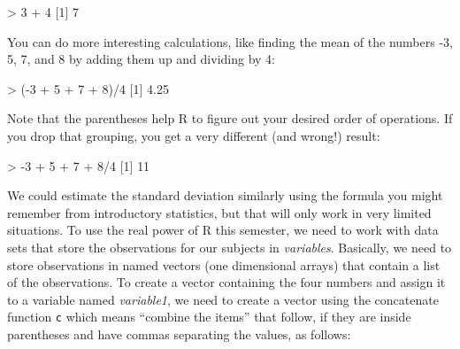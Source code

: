 \documentclass[
]{book}
\newenvironment{Shaded}{\begin{snugshade}}{\end{snugshade}}
\newcommand{\DecValTok}[1]{\textcolor[rgb]{0.00,0.00,0.81}{#1}}
\newcommand{\FloatTok}[1]{\textcolor[rgb]{0.00,0.00,0.81}{#1}}
\newcommand{\NormalTok}[1]{#1}
\newcommand{\SpecialCharTok}[1]{\textcolor[rgb]{0.00,0.00,0.00}{#1}}
\begin{document}
\begin{Shaded}
\begin{Highlighting}[]
\SpecialCharTok{\textgreater{}} \DecValTok{3} \SpecialCharTok{+} \DecValTok{4}
\NormalTok{[}\DecValTok{1}\NormalTok{] }\DecValTok{7}
\end{Highlighting}
\end{Shaded}

You can do more interesting calculations, like finding the mean of the
numbers -3, 5, 7, and 8 by adding them up and dividing by 4:

\begin{Shaded}
\begin{Highlighting}[]
\SpecialCharTok{\textgreater{}}\NormalTok{ (}\SpecialCharTok{{-}}\DecValTok{3} \SpecialCharTok{+} \DecValTok{5} \SpecialCharTok{+} \DecValTok{7} \SpecialCharTok{+} \DecValTok{8}\NormalTok{)}\SpecialCharTok{/}\DecValTok{4}
\NormalTok{[}\DecValTok{1}\NormalTok{] }\FloatTok{4.25}
\end{Highlighting}
\end{Shaded}

Note that the parentheses help R to figure out your desired order of operations. If you drop that grouping, you get
a very different (and wrong!) result:

\begin{Shaded}
\begin{Highlighting}[]
\SpecialCharTok{\textgreater{}} \SpecialCharTok{{-}}\DecValTok{3} \SpecialCharTok{+} \DecValTok{5} \SpecialCharTok{+} \DecValTok{7} \SpecialCharTok{+} \DecValTok{8}\SpecialCharTok{/}\DecValTok{4}
\NormalTok{[}\DecValTok{1}\NormalTok{] }\DecValTok{11}
\end{Highlighting}
\end{Shaded}

We could estimate the standard deviation similarly using the formula you might remember from introductory
statistics, but that will only work in very limited situations. To use the real
power of R this semester, we need to work with data sets that store the
observations for our subjects in \emph{variables}.
Basically, we need to store observations in named vectors (one dimensional
arrays) that contain a list of the observations. To create a vector containing
the four numbers and assign it to a variable named \emph{variable1}, we need to
create a vector using the concatenate function
\texttt{c} which means ``combine the items'' that follow, if they are inside
parentheses and have commas separating the values,
as follows:
\end{document}

